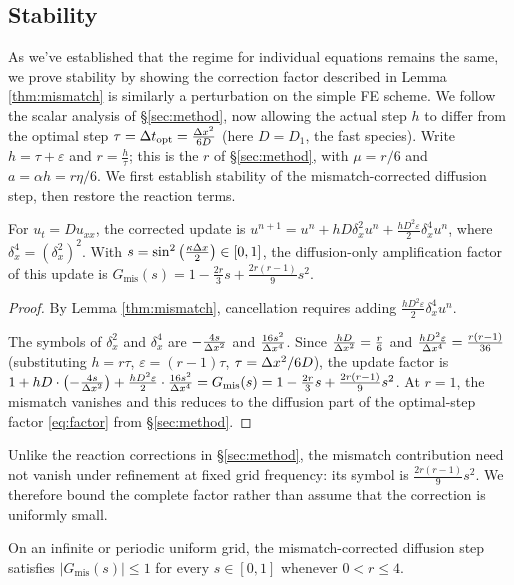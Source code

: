 \subsection{Stability}

As we've established that the regime for individual equations remains the same, we prove stability by showing the correction factor described in Lemma \ref{thm:mismatch} is similarly a perturbation on the simple FE scheme. We follow the scalar analysis of \S\ref{sec:method}, now allowing the actual step $h$ to differ from the optimal step $\tau=\Delta t_{\mathrm{opt}}=\frac{\Delta x^2}{6D}$ (here $D=D_1$, the fast species). Write $h=\tau+\varepsilon$ and $r=\frac{h}{\tau}$; this is the $r$ of \S\ref{sec:method}, with $\mu=r/6$ and $a=\alpha h=r\eta/6$. We first establish stability of the mismatch-corrected diffusion step, then restore the reaction terms.

\begin{lemma}
For $u_t=Du_{xx}$, the corrected update is
$u^{n+1}=u^n+hD\delta_x^2u^n
+\frac{hD^2\varepsilon}{2}\delta_x^4u^n$,
where $\delta_x^4=(\delta_x^2)^2$.
With $s=\sin^2\left(\frac{\kappa\Delta x}{2}\right)\in[0,1]$, the diffusion-only amplification factor of this update is
$G_{\mathrm{mis}}(s)
=1-\frac{2r}{3}s+\frac{2r(r-1)}{9}s^2$.
\end{lemma}

\begin{proof}
  By Lemma \ref{thm:mismatch}, cancellation requires adding $\frac{hD^2\varepsilon}{2}\delta_x^4u^n$.

The symbols of $\delta_x^2$ and $\delta_x^4$ are $-\frac{4s}{\Delta x^2}$ and $\frac{16s^2}{\Delta x^4}$. Since $\frac{hD}{\Delta x^2}=\frac{r}{6}$ and $\frac{hD^2\varepsilon}{\Delta x^4}=\frac{r(r-1)}{36}$ (substituting $h=r\tau$, $\varepsilon=(r-1)\tau$, $\tau=\Delta x^2/6D$), the update factor is
$1+hD\cdot\bigl(-\frac{4s}{\Delta x^2}\bigr)+\frac{hD^2\varepsilon}{2}\cdot\frac{16s^2}{\Delta x^4}
=G_{\mathrm{mis}}(s)
=1-\frac{2r}{3}s+\frac{2r(r-1)}{9}s^2$.
At $r=1$, the mismatch vanishes and this reduces to the diffusion part of the optimal-step factor \eqref{eq:factor} from \S\ref{sec:method}.
\end{proof}

Unlike the reaction corrections in \S\ref{sec:method}, the mismatch contribution need not vanish under refinement at fixed grid frequency: its symbol is $\frac{2r(r-1)}{9}s^2$. We therefore bound the complete factor rather than assume that the correction is uniformly small.

\begin{lemma}
On an infinite or periodic uniform grid, the mismatch-corrected diffusion step satisfies $|G_{\mathrm{mis}}(s)|\le1$ for every $s\in[0,1]$ whenever $0<r\le4$.
\end{lemma}

